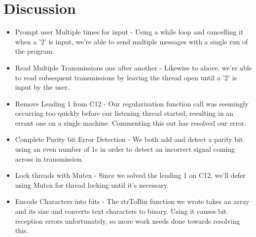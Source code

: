 \documentclass{article}
\begin{document}
\section*{Discussion}
\begin{itemize}
\item Prompt user Multiple times for input - Using a while loop and cancelling it when a '2' is input, we're able to send multiple messages with a single run of the program.
\item Read Multiple Transmissions one after another - Likewise to above, we're able to read subsequent transmissions by leaving the thread open until a '2' is input by the user.
\item Remove Leading 1 from C12 - Our regularization function call was seemingly occurring too quickly before our listening thread started, resulting in an errant one on a single machine. Commenting this out has resolved our error.
\item Complete Parity bit Error Detection - We both add and detect a parity bit using an even number of 1s in order to detect an incorrect signal coming across in transmission.
\item Lock threads with Mutex - Since we solved the leading 1 on C12, we'll defer using Mutex for thread locking until it's necessary.
\item Encode Characters into bits - The strToBin function we wrote takes an array and its size and converts text characters to binary. Using it causes bit reception errors unfortunately, so more work needs done towards resolving this.

\end{itemize}

\end{document}
